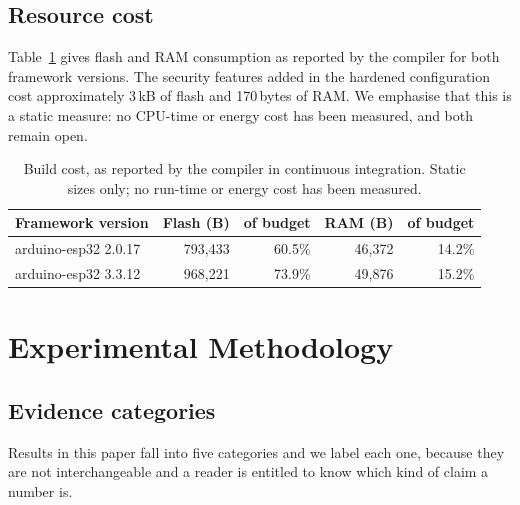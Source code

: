 \subsection{Resource cost}

Table~\ref{tab:build} gives flash and RAM consumption as reported by the compiler for both
framework versions. The security features added in the hardened configuration cost
approximately 3\,kB of flash and 170\,bytes of RAM. We emphasise that this is a static measure:
no CPU-time or energy cost has been measured, and both remain open.

\begin{table}[htbp]
\centering\small
\caption{Build cost, as reported by the compiler in continuous integration. Static sizes only;
no run-time or energy cost has been measured.}
\label{tab:build}
\begin{tabular}{@{}lrrrr@{}}
\toprule
Framework version & Flash (B) & of budget & RAM (B) & of budget \\
\midrule
arduino-esp32 2.0.17 & 793{,}433 & 60.5\% & 46{,}372 & 14.2\% \\
arduino-esp32 3.3.12 & 968{,}221 & 73.9\% & 49{,}876 & 15.2\% \\
\bottomrule
\end{tabular}
\end{table}

\section{Experimental Methodology}\label{sec:method}

\subsection{Evidence categories}

Results in this paper fall into five categories and we label each one, because they are not
interchangeable and a reader is entitled to know which kind of claim a number is.

